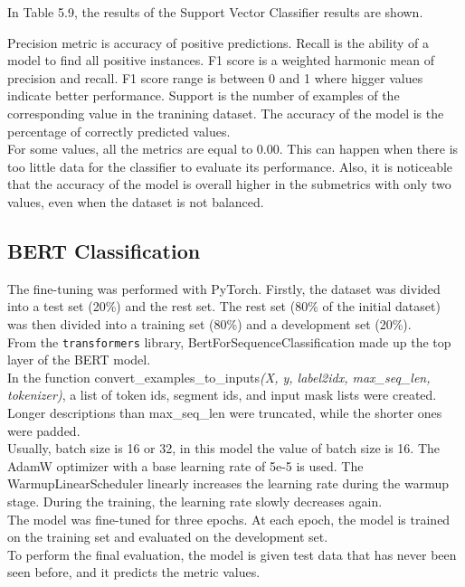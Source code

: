 \documentclass[times, utf8, zavrsni, english]{fer}
\begin{document}
In Table 5.9, the results of the Support Vector Classifier results are shown. 

Precision metric is accuracy of positive predictions. Recall is the ability of a model to find all positive instances. F1 score is a weighted harmonic mean of precision and recall. F1 score range is between 0 and 1 where higger values indicate better performance. Support is the number of examples of the corresponding value in the tranining dataset.
The accuracy of the model is the percentage of correctly predicted values. \\

For some values, all the metrics are equal to 0.00. This can happen when there is too little data for the classifier to evaluate its performance. Also, it is noticeable that the accuracy of the model is overall higher in the submetrics with only two values, even when the dataset is not balanced.


\subsection{BERT Classification}
The fine-tuning was performed with PyTorch.
Firstly, the dataset was divided into a test set (20\%) and the rest set. The rest set (80\% of the initial dataset) was then divided into a training set (80\%) and a development set (20\%).\\
From the \texttt{transformers} library, BertForSequenceClassification made up the top layer of the BERT model.\\
In the function convert\_examples\_to\_inputs\textit{(X, y, label2idx, max\_seq\_len, tokenizer)}, a list of token ids, segment ids, and input mask lists were created. Longer descriptions than max\_seq\_len were truncated, while the shorter ones were padded. \\
Usually, batch size is 16 or 32, in this model the value of batch size is 16.
The AdamW optimizer with a base learning rate of 5e-5  is used. The WarmupLinearScheduler linearly increases the learning rate during the warmup stage. During the training, the learning rate slowly decreases again.\\
The model was fine-tuned for three epochs.
At each epoch, the model is trained on the training set and evaluated on the development set. \\
To perform the final evaluation, the model is given test data that has never been seen before, and it predicts the metric values. \\
\end{document}
